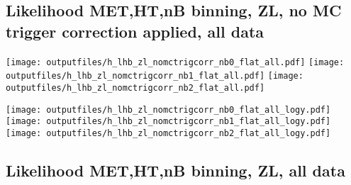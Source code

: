 \documentclass[11pt]{article}
\begin{document}






    \subsection{ Likelihood MET,HT,nB binning, ZL, no MC trigger correction applied, all data}

    \noindent
     \texttt{[image: outputfiles/h\_lhb\_zl\_nomctrigcorr\_nb0\_flat\_all.pdf]}
     \texttt{[image: outputfiles/h\_lhb\_zl\_nomctrigcorr\_nb1\_flat\_all.pdf]}
     \texttt{[image: outputfiles/h\_lhb\_zl\_nomctrigcorr\_nb2\_flat\_all.pdf]}

    \noindent
     \texttt{[image: outputfiles/h\_lhb\_zl\_nomctrigcorr\_nb0\_flat\_all\_logy.pdf]}
     \texttt{[image: outputfiles/h\_lhb\_zl\_nomctrigcorr\_nb1\_flat\_all\_logy.pdf]}
     \texttt{[image: outputfiles/h\_lhb\_zl\_nomctrigcorr\_nb2\_flat\_all\_logy.pdf]}


    \subsection{ Likelihood MET,HT,nB binning, ZL, all data}
\end{document}
